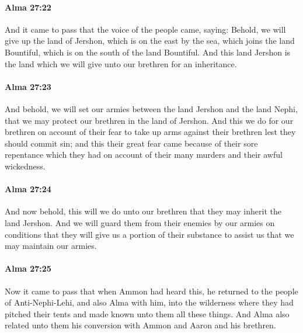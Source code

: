 		\paragraph{Alma 27:22} %
			\label{ALMA-27-22}

			And it came to pass that the voice of the people came, saying:
			Behold, we will give up the land of Jershon,
			which is on the east by the sea,
			which joins the land Bountiful,
			which is on the south of the land Bountiful.
			And this land Jershon is the land
			which we will give unto our brethren for an inheritance.

		\paragraph{Alma 27:23} %
			\label{ALMA-27-23}

			And behold, we will set our armies between the land Jershon and the land Nephi,
			that we may protect our brethren in the land of Jershon.
			And this we do for our brethren
			on account of their fear to take up arms against their brethren
			lest they should commit sin;
			and this their great fear came because of their sore repentance
			which they had on account of their many murders and their awful wickedness.

		\paragraph{Alma 27:24} %
			\label{ALMA-27-24}

			And now behold, this will we do unto our brethren
			that they may inherit the land Jershon.
			And we will guard them from their enemies by our armies
			on conditions that they will give us a portion of their substance
			to assist us that we may maintain our armies.

		\paragraph{Alma 27:25} %
			\label{ALMA-27-25}

			Now it came to pass that when Ammon had heard this,
			he returned to the people of Anti-Nephi-Lehi, and also Alma with him,
			into the wilderness where they had pitched their tents
			and made known unto them all these things.
			And Alma also related unto them his conversion
			with Ammon and Aaron and his brethren.

